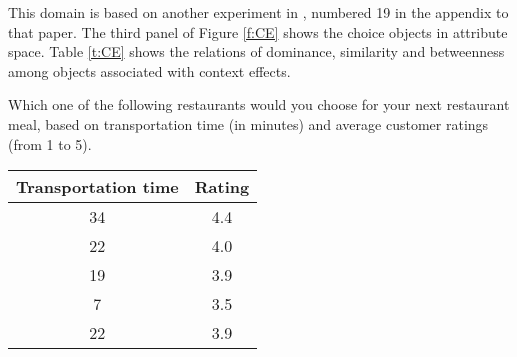 This domain is based on another experiment in , numbered 19 in the appendix to that paper.
The third panel of Figure \ref{f:CE} shows the choice objects in attribute space.
Table \ref{t:CE} shows the relations of dominance, similarity and betweenness among objects associated with context effects.

\begin{tcolorbox}
Which one of the following restaurants would you choose for your next restaurant meal, based on transportation time (in minutes) and average customer ratings (from
1 to 5).
	
\begin{tabular}{cc}
\hline
Transportation time & Rating \\ \hline
34 & 4.4 \\ 
22 & 4.0 \\ 
19 & 3.9 \\ 
7 & 3.5 \\ 
22 & 3.9 \\ \hline
\end{tabular}
\end{tcolorbox}
